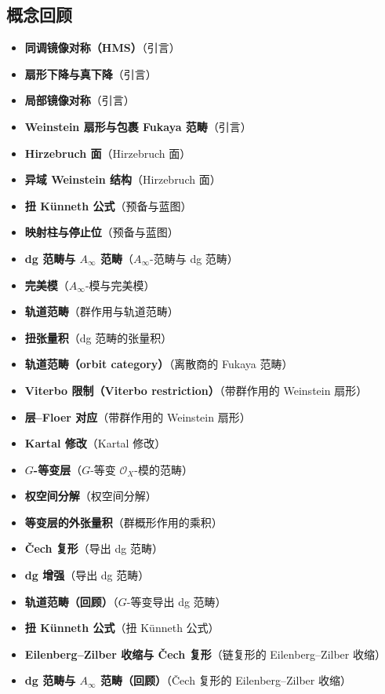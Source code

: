 \documentclass[11pt,a4paper]{article}
\theoremstyle{cnth}
\begin{document}
\subsection*{概念回顾}
\begin{itemize}[leftmargin=1.2em,itemsep=1pt]
\item \textbf{同调镜像对称（HMS）}\quad（引言）
\item \textbf{扇形下降与真下降}\quad（引言）
\item \textbf{局部镜像对称}\quad（引言）
\item \textbf{Weinstein 扇形与包裹 Fukaya 范畴}\quad（引言）
\item \textbf{Hirzebruch 面}\quad（Hirzebruch 面）
\item \textbf{异域 Weinstein 结构}\quad（Hirzebruch 面）
\item \textbf{扭 Künneth 公式}\quad（预备与蓝图）
\item \textbf{映射柱与停止位}\quad（预备与蓝图）
\item \textbf{dg 范畴与 $A_{\infty}$ 范畴}\quad（$A_{\infty}$-范畴与 dg 范畴）
\item \textbf{完美模}\quad（$A_{\infty}$-模与完美模）
\item \textbf{轨道范畴}\quad（群作用与轨道范畴）
\item \textbf{扭张量积}\quad（dg 范畴的张量积）
\item \textbf{轨道范畴（orbit category）}\quad（离散商的 Fukaya 范畴）
\item \textbf{Viterbo 限制（Viterbo restriction）}\quad（带群作用的 Weinstein 扇形）
\item \textbf{层--Floer 对应}\quad（带群作用的 Weinstein 扇形）
\item \textbf{Kartal 修改}\quad（Kartal 修改）
\item \textbf{$G$-等变层}\quad（$G$-等变 $\mathcal{O}_X$-模的范畴）
\item \textbf{权空间分解}\quad（权空间分解）
\item \textbf{等变层的外张量积}\quad（群概形作用的乘积）
\item \textbf{Čech 复形}\quad（导出 dg 范畴）
\item \textbf{dg 增强}\quad（导出 dg 范畴）
\item \textbf{轨道范畴（回顾）}\quad（$G$-等变导出 dg 范畴）
\item \textbf{扭 Künneth 公式}\quad（扭 Künneth 公式）
\item \textbf{Eilenberg–Zilber 收缩与 Čech 复形}\quad（链复形的 Eilenberg--Zilber 收缩）
\item \textbf{dg 范畴与 $A_\infty$ 范畴（回顾）}\quad（\v{C}ech 复形的 Eilenberg--Zilber 收缩）
\end{itemize}
\end{document}
